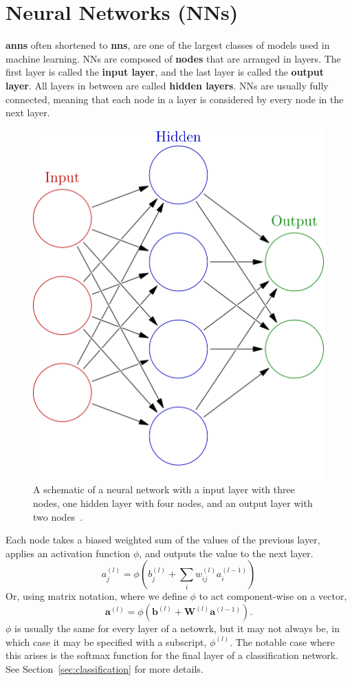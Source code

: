 \documentclass[12pt]{report}
\theoremstyle{definition}
\theoremstyle{remark}
\begin{document}
\section{Neural Networks (NNs)}\label{sec:nn}

\textbf{\Glspl{ann}} often shortened to \textbf{\glspl{nn}}, are one of the largest classes of models used in machine learning. NNs are composed of \textbf{\glspl{node}} that are arranged in layers. The first layer is called the \textbf{input layer}, and the last layer is called the \textbf{output layer}. All layers in between are called \textbf{hidden layers}. NNs are usually fully connected, meaning that each node in a layer is considered by every node in the next layer.

\begin{figure}[h]
    \centering
    \includegraphics[width=0.3\linewidth]{figs/colored_neural_network.png}
    \caption{A schematic of a neural network with a input layer with three nodes, one hidden layer with four nodes, and an output layer with two nodes~\cite{commons_filecolored_2025}.}
    \label{fig:enter-label}
\end{figure}

Each node takes a biased weighted sum of the values of the previous layer, applies an activation function $\phi$, and outputs the value to the next layer.
\begin{equation} \label{eq:node}
    a^{(l)}_j = \phi\left(b_j^{(l)} + \sum_i w_{ij}^{(l)} a_i^{(l-1)}\right)
\end{equation}
Or, using matrix notation, where we define $\phi$ to act component-wise on a vector,
\begin{equation}
    \mathbf{a}^{(l)} = \phi\left(\mathbf{b}^{(l)} + \mathbf{W}^{(l)}\mathbf{a}^{(l-1)}\right).
\end{equation}
$\phi$ is usually the same for every layer of a netowrk, but it may not always be, in which case it may be specified with a subscript, $\phi^{(l)}$. The notable case where this arises is the softmax function for the final layer of a classification network. See Section~\ref{sec:classification} for more details.
\end{document}
